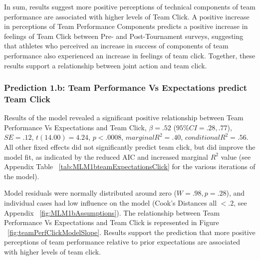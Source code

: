 \begin{CJK}{UTF8}{gbsn}
In sum, results suggest more positive perceptions of technical components of team performance are associated with higher levels of Team Click. A positive increase in perceptions of Team Performance Components predicts a positive increase in feelings of Team Click between Pre- and Post-Tournament surveys, suggesting that athletes who perceived an increase in success of components of team performance also experienced an increase in feelings of team click. Together, these results support a relationship between joint action and team click.






\subsubsection{Prediction 1.b: Team Performance Vs Expectations predict Team Click\label{sect:prediction1b}}

Results of the model revealed a significant positive relationship between Team Performance Vs Expectations and Team Click, $\beta = .52$ ($95\% CI =  .28, .77$), $SE = .12$, $t(14.00) = 4.24$, $p < .0008$, $marginal R^2 = .40$, $conditional R^2 = .56$.  All other fixed effects did not significantly predict team click, but did improve the model fit, as indicated by the reduced AIC and increased marginal $R^2$ value (see Appendix Table ~\ref{tab:MLM1bteamExpectationsClick} for the various iterations of the model).

Model residuals were normally distributed around zero ($W = .98, p = .28$), and individual cases had low influence on the model (Cook's Distances all $< .2$, see Appendix ~\ref{fig:MLM1bAssumptions}).  The relationship between Team Performance Vs Expectations and Team Click is represented in Figure ~\ref{fig:teamPerfClickModelSlope}.  Results support the prediction that more positive perceptions of team performance relative to prior expectations are associated with higher levels of team click.



\end{CJK}
